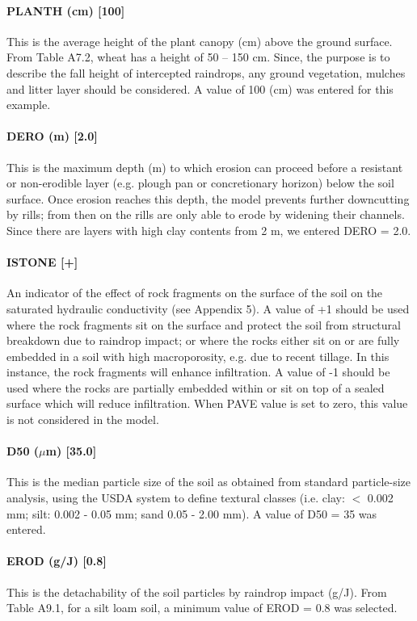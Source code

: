 \paragraph{PLANTH (cm) [100]}
This is the average height of the plant canopy (cm) above the ground surface. From Table A7.2, wheat has a height of 50 -- 150 cm. Since, the purpose is to describe the fall height of intercepted raindrops, any ground vegetation, mulches and litter layer should be considered. A value of 100 (cm) was entered for this example.
 
\paragraph{DERO (m) [2.0]}
This is the maximum depth (m) to which erosion can proceed before a resistant or non-erodible layer (e.g. plough pan or concretionary horizon) below the soil surface. Once erosion reaches this depth, the model prevents further downcutting by rills; from then on the rills are only able to erode by widening their channels. Since there are layers with high clay contents from 2 m, we entered DERO = 2.0.
 
\paragraph{ISTONE [+]}
An indicator of the effect of rock fragments on the surface of the soil on the saturated hydraulic conductivity (see Appendix 5).
A value of +1 should be used where the rock fragments sit on the surface and protect the soil from structural breakdown due to raindrop impact; or where the rocks either sit on or are fully embedded in a soil with high macroporosity, e.g. due to recent tillage. In this instance, the rock fragments will enhance infiltration.
A value of -1 should be used where the rocks are partially embedded within or sit on top of a sealed surface which will reduce infiltration.
When PAVE value is set to zero, this value is not considered in the model.
 
\paragraph{D50 ($\mu$m) [35.0]}
This is the median particle size of the soil as obtained from standard particle-size analysis, using the USDA system to define textural classes (i.e. clay: $<$ 0.002 mm; silt: 0.002 - 0.05 mm; sand 0.05 - 2.00 mm).
A value of D50 = 35 was entered.
 
\paragraph{EROD (g/J) [0.8]}
This is the detachability of the soil particles by raindrop impact (g/J). From Table A9.1, for a silt loam soil, a minimum value of EROD = 0.8 was selected.
 

